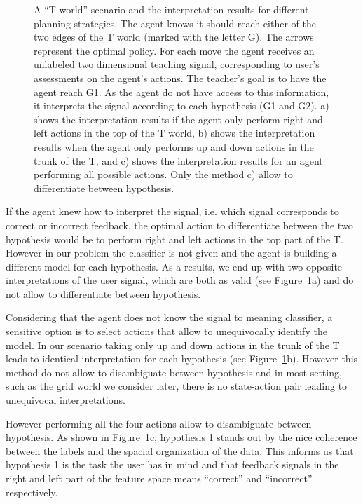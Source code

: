 \begin{figure}[!ht]
      \caption{A ``T world'' scenario and the interpretation results for different planning strategies. The agent knows it should reach either of the two edges of the T world (marked with the letter G). The arrows represent the optimal policy. For each move the agent receives an unlabeled two dimensional teaching signal, corresponding to user's assessments on the agent's actions. The teacher's goal is to have the agent reach G1. As the agent do not have access to this information, it interprets the signal according to each hypothesis (G1 and G2). a) shows the interpretation results if the agent only perform right and left actions in the top of the T world, b) shows the interpretation results when the agent only performs up and down actions in the trunk of the T, and c) shows the interpretation results for an agent performing all possible actions. Only the method c) allow to differentiate between hypothesis.}
    \label{fig:planningExplained}
\end{figure}

If the agent knew how to interpret the signal, i.e. which signal corresponds to correct or incorrect feedback, the optimal action to differentiate between the two hypothesis would be to perform right and left actions in the top part of the T. However in our problem the classifier is not given and the agent is building a different model for each hypothesis. As a results, we end up with two opposite interpretations of the user signal, which are both as valid (see Figure~\ref{fig:planningExplained}a) and do not allow to differentiate between hypothesis.

Considering that the agent does not know the signal to meaning classifier, a sensitive option is to select actions that allow to unequivocally identify the model. In our scenario taking only up and down actions in the trunk of the T leads to identical interpretation for each hypothesis (see Figure~\ref{fig:planningExplained}b). However this method do not allow to disambiguate between hypothesis and in most setting, such as the grid world we consider later, there is no state-action pair leading to unequivocal interpretations.

However performing all the four actions allow to disambiguate between hypothesis. As shown in Figure~\ref{fig:planningExplained}c, hypothesis 1 stands out by the nice coherence between the labels and the spacial organization of the data. This informs us that hypothesis 1 is the task the user has in mind and that feedback signals in the right and left part of the feature space means ``correct'' and ``incorrect'' respectively.

